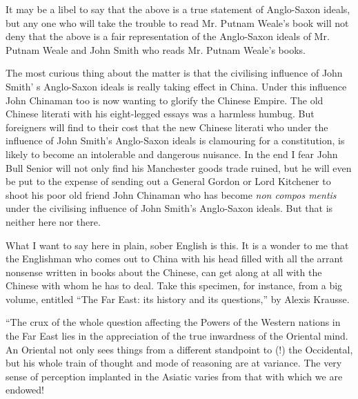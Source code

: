 It may be a libel to say that the above is a true statement of Anglo-Saxon ideals,
but any one who will take the trouble to read Mr. Putnam Weale's book will not deny
that the above is a fair representation of the Anglo-Saxon ideals of Mr. Putnam Weale
and John Smith who reads Mr. Putnam Weale's books.

The most curious thing about the matter is that the civilising influence of John Smith' s Anglo-Saxon ideals is really taking effect in China. Under this influence John Chinaman too is now wanting to glorify the Chinese Empire.
The old Chinese literati with his eight-legged essays was a harmless humbug. But foreigners will find to their cost that the new Chinese literati who under the influence of John Smith's Anglo-Saxon ideals is clamouring for a constitution, is likely to become an intolerable and dangerous nuisance.
In the end I fear John Bull Senior will not only find his Manchester goods trade ruined,
but he will even be put to the expense of sending out a General Gordon
or Lord Kitchener to shoot his poor old friend John Chinaman
who has become \emph{non compos mentis} under the civilising influence of John Smith's Anglo-Saxon ideals.
But that is neither here nor there.

What I want to say here in plain, sober English is this.
It is a wonder to me that the Englishman who comes out to China
with his head filled with all the arrant nonsense written in books about the Chinese,
can get along at all with the Chinese with whom he has to deal.
Take this specimen, for instance, from a big volume,
entitled ``The Far East: its history and its questions,'' by Alexis Krausse.

``The crux of the whole question affecting the Powers of the Western nations
in the Far East lies in the appreciation of the true inwardness of the Oriental mind.
An Oriental not only sees things from a different standpoint to (!) the Occidental,
but his whole train of thought and mode of reasoning are at variance.
The very sense of perception implanted in the Asiatic varies
from that with which we are endowed!

